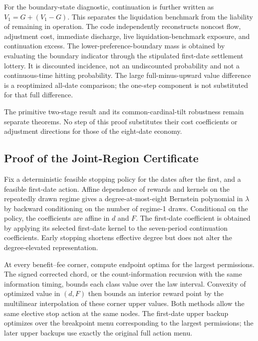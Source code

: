 For the boundary-state diagnostic, continuation is further written as $V_1=G+(V_1-G)$. This separates the liquidation benchmark from the liability of remaining in operation. The code independently reconstructs noncost flow, adjustment cost, immediate discharge, live liquidation-benchmark exposure, and continuation excess. The lower-preference-boundary mass is obtained by evaluating the boundary indicator through the stipulated first-date settlement lottery. It is discounted incidence, not an undiscounted probability and not a continuous-time hitting probability. The large full-minus-upward value difference is a reoptimized all-date comparison; the one-step component is not substituted for that full difference.

The primitive two-stage result and its common-cardinal-tilt robustness remain separate theorems. No step of this proof substitutes their cost coefficients or adjustment directions for those of the eight-date economy.

\subsection{Proof of the Joint-Region Certificate}
Fix a deterministic feasible stopping policy for the dates after the first, and a feasible first-date action. Affine dependence of rewards and kernels on the repeatedly drawn regime gives a degree-at-most-eight Bernstein polynomial in $\lambda$ by backward conditioning on the number of regime-1 draws. Conditional on the policy, the coefficients are affine in $d$ and $F$. The first-date coefficient is obtained by applying its selected first-date kernel to the seven-period continuation coefficients. Early stopping shortens effective degree but does not alter the degree-elevated representation.

At every benefit--fee corner, compute endpoint optima for the largest permissions. The signed corrected chord, or the count-information recursion with the same information timing, bounds each class value over the law interval. Convexity of optimized value in $(d,F)$ then bounds an interior reward point by the multilinear interpolation of these corner upper values. Both methods allow the same elective stop action at the same nodes. The first-date upper backup optimizes over the breakpoint menu corresponding to the largest permissions; the later upper backups use exactly the original full action menu.

